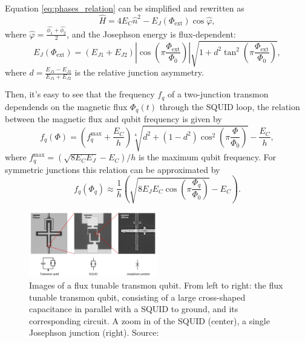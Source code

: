 Equation \ref{eq:phases_relation} can be simplified and rewritten as 
\begin{equation}\label{eq:tunable_transmon_hamiltonian}
    \hat{H} = 4E_C\hat{n}^2 - E_J(\Phi_{\text{ext}})\cos{\hat{\varphi}},
\end{equation}
where $\hat{\varphi} = \frac{\hat{\phi_1}+\hat{\phi_2}}{2}$, and the Josephson energy is flux-dependent: 
\begin{equation}\label{eq:EJ_tunable}
    E_J(\Phi_{\text{ext}}) = (E_{J1} + E_{J2}) \left| \cos \left( \pi \frac{\Phi_{\text{ext}}}{\Phi_0} \right) \right| \sqrt{1 + d^2 \tan^2 \left( \pi \frac{\Phi_{\text{ext}}}{\Phi_0} \right) },
\end{equation}
where $d = \frac{E_{J1}-E_{J2}}{E_{J1}+E_{J2}}$ is the relative junction asymmetry.

Then, it's easy to see that the frequency $f_q$ of a two-junction transmon dependends on the magnetic flux $\Phi_q(t)$ through the SQUID loop, the relation between the magnetic flux and qubit frequency is given by \cite{PhysRevApplied.20.024070}
\begin{equation}\label{eq:freqdepndenceonflux}
    f_q(\Phi) = \left( f_q^{\text{max}} + \frac{E_C}{h} \right) \sqrt[4]{d^2 + (1 - d^2) \cos^2 \left( \pi \frac{\Phi}{\Phi_0} \right)} - \frac{E_C}{h},
\end{equation}
where $f_q^{\text{max}} = (\sqrt{8E_C E_J}-E_C)/h$ is the maximum qubit frequency. For symmetric junctions this relation can be approximated by \cite{rol_time-domain_2020}
\begin{equation}\label{eq:freqdepndenceonflux_approx}
    f_q(\Phi_q) \approx \frac{1}{h} \left( \sqrt{8E_J E_C \cos\left(\pi \frac{\Phi_q}{\Phi_0} \right)} - E_C \right).
\end{equation}

\begin{figure}[ht!]
    \centering
    \includegraphics[width=0.50\textwidth]{figures/png/FrequencyTunableTransmon.png}
    \caption{Images of a flux tunable transmon qubit. From left to right: the flux tunable transmon qubit, consisting of a large cross-shaped capacitance in parallel with a SQUID to ground, and its corresponding circuit. A zoom in of the SQUID (center), a single Josephson junction (right). Source: \cite{Roth_2023}}
    \label{fig:FrequencyTunableTransmon}
\end{figure}

